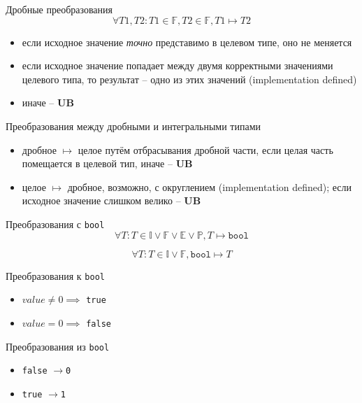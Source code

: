 \documentclass[unknownkeysallowed,xcolor=table]{beamer}
\newcommand{\rarr}{$\rightarrow$}
\begin{document}
\begin{frame}[fragile]{Дробные преобразования}
  \[
    \forall T1, T2: T1 \in \mathbb{F}, T2 \in \mathbb{F}, T1 \mapsto T2
  \]

  \vspace{1em}

  \begin{itemize}
    \item если исходное значение \emph{точно} представимо в целевом типе, оно не меняется \vspace{1em}
    \item если исходное значение попадает между двумя корректными значениями целевого типа, то результат -- одно из этих значений (implementation defined) \vspace{1em}
    \item иначе -- \textbf{UB}
  \end{itemize}
\end{frame}

\begin{frame}[fragile]{Преобразования между дробными и интегральными типами}
  \begin{itemize}
    \item дробное $\mapsto$ целое путём отбрасывания дробной части, если целая часть помещается в целевой тип, иначе -- \textbf{UB} \vspace{2em}
    \item целое $\mapsto$ дробное, возможно, с округлением (implementation defined); если исходное значение слишком велико -- \textbf{UB}
  \end{itemize}
\end{frame}

\begin{frame}[fragile]{Преобразования с \lstinline{bool}}
  \[
    \forall T: T \in \mathbb{I} \lor \mathbb{F} \lor \mathbb{E} \lor \mathbb{P}, T \mapsto \mathtt{bool}
  \]

  \[
    \forall T: T \in \mathbb{I} \lor \mathbb{F}, \mathtt{bool} \mapsto T
  \]

  \vspace{1em}

  Преобразования к \lstinline{bool}
  \begin{itemize}
    \item $value \neq 0 \implies$ \lstinline{true} \vspace{0.5em}
    \item $value = 0 \implies$ \lstinline{false}
  \end{itemize}

  \vspace{1em}
  Преобразования из \lstinline{bool}
  \begin{itemize}
    \item \lstinline{false} \rarr \lstinline{0} \vspace{0.5em}
    \item \lstinline{true} \rarr \lstinline{1}
  \end{itemize}
\end{frame}
\end{document}
